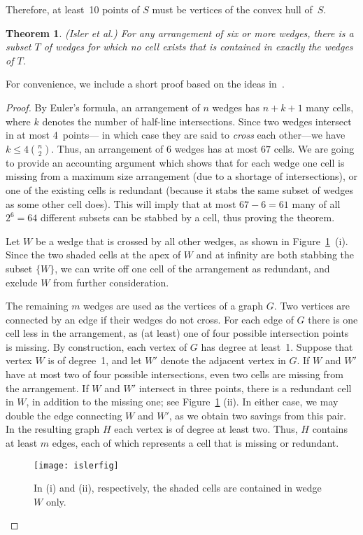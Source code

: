 \documentclass[11pt]{article}
\newtheorem{theorem}{Theorem}
\begin{document}
Therefore, at least~10 points of $S$ must be vertices of the convex hull of~$S$.

\begin{theorem}         \label{isler-theo}
(Isler et al.) For any arrangement of six or more wedges, there is a subset $T$ of wedges for which
no cell exists that is contained in exactly the wedges of $T$.
\end{theorem}
For convenience, we include a short proof based on the ideas in~\cite{ikdv-vcdev-04}.
\begin{proof}
By Euler's formula, an arrangement of $n$ wedges has $n+k+1$ many cells, where $k$
denotes the number of half-line intersections. Since two wedges intersect in at most 4~points---
in which case they are said to {\em cross} each other---we have
$k \leq 4 {n \choose {2}}$. Thus, an arrangement of $6$ wedges has at most $67$ cells.
We are going to provide an accounting argument which shows that for each wedge
one cell is missing from a maximum size arrangement (due to a shortage of intersections), or
one of the existing cells is redundant (because it stabs the same subset of wedges as some
other cell does). This will imply that at most $67-6 =61$ many of all $2^6=64$ different
subsets can be stabbed by a cell, thus proving the theorem.


Let $W$ be a wedge that is crossed by all other wedges, as shown in Figure~\ref{isler-fig}~(i).
Since the two shaded cells at the apex of $W$ and at infinity are both stabbing the subset $\{W\}$,
we can write off one cell of the arrangement as redundant, and exclude $W$ from further consideration.

The remaining $m$ wedges are used as the vertices of a graph $G$. Two vertices are connected
by an edge if their wedges do not cross. For each edge of $G$ there is one cell less in the arrangement,
as (at least) one of four possible intersection points is missing.
By construction, each vertex of $G$ has degree at least~1. Suppose that vertex $W$
is of degree~1, and let $W'$ denote the adjacent vertex in $G$.
If $W$ and $W'$ have at most two of four possible intersections,
even two cells are missing from the arrangement. If $W$ and $W'$ intersect in three points,
there is a redundant cell in $W$, in addition to the missing one; see Figure~\ref{isler-fig} (ii).
In either case, we may double the edge connecting $W$ and $W'$, as we obtain two savings
from this pair. In the resulting graph $H$ each vertex is of degree at least two. Thus,
$H$ contains at least $m$ edges, each of which represents a cell that is missing or redundant.
\begin{figure}[hbtp]\begin{center}\texttt{[image: islerfig]}\caption{In (i) and (ii), respectively, the shaded cells are contained in wedge $W$ only.}\label{isler-fig}
 \end{center}\end{figure}
\end{proof}
\end{document}
